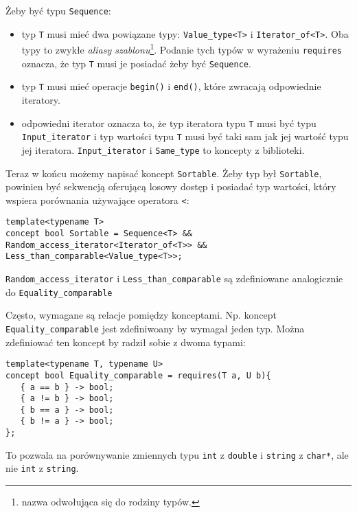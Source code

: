 \documentclass[11pt, a4paper]{article}
\begin{document}
Żeby być typu \verb#Sequence#:

\begin{itemize}

\item typ \verb#T# musi mieć dwa powiązane typy: \verb#Value_type<T># i \verb#Iterator_of<T>#. Oba typy to zwykłe \emph{aliasy szablonu}\footnote{nazwa odwołująca się do rodziny typów.}. Podanie tych typów w wyrażeniu \verb#requires# oznacza, że typ \verb#T# musi je posiadać żeby być \verb#Sequence#.

\item typ \verb#T# musi mieć operacje \verb#begin()# i \verb#end()#, które zwracają odpowiednie iteratory.

\item odpowiedni iterator oznacza to, że typ iteratora typu \verb#T# musi być typu \verb#Input_iterator# i typ wartości typu \verb#T# musi być taki sam jak jej wartość typu jej iteratora. \verb#Input_iterator# i \verb#Same_type# to koncepty z biblioteki.

\end{itemize}

Teraz w końcu możemy napisać koncept \verb#Sortable#. Żeby typ był \verb#Sortable#, powinien być sekwencją oferującą losowy dostęp i posiadać typ wartości, który wspiera porównania używające operatora \verb#<#:

\begin{lstlisting}[frame=single]
template<typename T>
concept bool Sortable = Sequence<T> &&
Random_access_iterator<Iterator_of<T>> &&
Less_than_comparable<Value_type<T>>;
\end{lstlisting}

\verb#Random_access_iterator# i \verb#Less_than_comparable# są zdefiniowane analogicznie do \verb#Equality_comparable#

Często, wymagane są relacje pomiędzy konceptami. Np. koncept \newline \verb#Equality_comparable# jest zdefiniwoany by wymagał jeden typ. Można zdefiniować ten koncept by radził sobie z dwoma typami:

\begin{lstlisting}[frame=single]
template<typename T, typename U>
concept bool Equality_comparable = requires(T a, U b){
   { a == b } -> bool;
   { a != b } -> bool;
   { b == a } -> bool;
   { b != a } -> bool;
};
\end{lstlisting}

To pozwala na porównywanie zmiennych typu \verb#int# z \verb#double# i \verb#string# z \verb#char*#, ale nie \verb#int# z \verb#string#.
\end{document}
